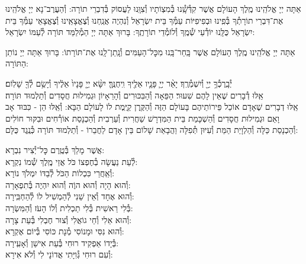 \documentclass[twoside, openany, parskip=half, 11pt]{book}
\begin{document}
אַתָּה יְיָ אֱלֹהֵֽינוּ מֶֽלֶךְ הָעוֹלָם אֲשֶׁר קִדְּ֯שָֽׁ֯נוּ בְּ֯מִצְוֹתָיו וְ֯צִוָּֽנוּ לַעֲסוֹק בְּ֯דִבְרֵי תוֹרָה: וְ֯הַעֲרֶב־נָא יְיָ אֱלֹהֵֽינוּ אֶת־דִּבְרֵי תוֹרָתְ֯ךָ בְּ֯פִֽינוּ וּבְפִיפִיּוֹת עַמְּ֯ךָ בֵּית יִשְׂרָאֵל וְ֯נִהְיֶה אֲנַֽחְנוּ וְ֯צֶאֱצָאֵֽינוּ וְ֯צֶאֱצָאֵי עַמְּ֯ךָ בֵּית יִשְׂרָאֵל כֻּלָּֽנוּ יוֹדְ֯עֵי שְׁ֯מֶֽךָ וְ֯לוֹמְ֯דֵי תוֹרָתֶֽךָ: בָּרוּךְ אַתָּה יְיָ הַמְ֯לַמֵּד תּוֹרָה לְ֯עַמּוֹ יִשְׂרָאֵל:

אַתָּה יְיָ אֱלֹהֵֽינוּ מֶֽלֶךְ הָעוֹלָם אֲשֶׁר בָּֽחַר־בָּֽנוּ מִכׇּל־הָעַמִּים וְ֯נָֽתַן־לָֽנוּ אֶת־תּוֹרָתוֹ: בָּרוּךְ אַתָּה יְיָ נוֹתֵן הַתּוֹרָה:



יְ֯בָֽרֶכְ֯ךָ֥ יְיָ֖ וְ֯יִשְׁמְ֯רֶֽךָ׃ יָאֵ֨ר יְיָ֧ פָּנָ֛יו אֵלֶ֖יךָ וִֽיחֻנֶּֽךָּ׃ יִשָּׂ֨א יְיָ֤ פָּנָיו֙ אֵלֶ֔יךָ וְ֯יָשֵׂ֥ם לְ֯ךָ֖ שָׁלֽוֹם׃\\
אֵֽלּוּ דְ֯בָרִים שֶׁאֵין לָהֶם שִׁעוּר׃ הַפֵּאָה וְ֯הַבִּכּוּרִים וְ֯הָרֵאָיוֹן וּגְמִילוּת חֲסָדִים וְ֯תַלְמוּד תּוֹרָה׃\\
אֵֽלּוּ דְבָרִים שֶׁאָדָם אוֹכֵל פֵּירוֹתֵיהֶם בָּעוֹלָם הַזֶּה וְ֯הַקֶּֽרֶן קַיֶּֽמֶת לוֹ לָעוֹלָם הַבָּא: וְ֯אֵֽלּוּ הֵן - כִּבּוּד אָב וָאֵם וּגְמִילוּת חֲסָדִים וְ֯הַשְׁכָּמַת בֵּית הַמִּדְרָשׁ שַׁחֲרִית וְ֯עַרְבִית וְ֯הַכְנָסַת אוֹרְ֯חִים וּבִקּוּר חוֹלִים וְ֯הַכְנָסַת כַּלָּה וְ֯הַלְוָיַת הַמֵּת וְ֯עִיּוּן תְּ֯פִלָּה וַהֲבָאַת שָׁלוֹם בֵּין אָדָם לַחֲבֵרוֹ - וְ֯תַלְמוּד תּוֹרָה כְּ֯נֶֽגֶד כֻּלָּם:




\newcommand{\adonolam}{

\firstword{אֲדוֹן עוֹלָם}
אֲשֶׁר מָלַךְ \hfill בְּ֯טֶֽרֶם כׇּל־יְ֯צִיר נִבְרָא: \\
לְ֯עֵת נַעֲשָׂה בְ֯חֶפְצוֹ כֹּל \hfill אֲזַי מֶֽלֶךְ שְׁ֯מוֹ נִקְרָא:\\
וְ֯אַֽחֲרֵי כִּכְלוֹת הַכֹּל \hfill לְ֯בַדּוֹ יִמְלֹךְ נוֹרָא: \\
וְ֯הוּא הָיָה וְ֯הוּא הוֶֹה \hfill וְ֯הוּא יִהְיֶה בְּ֯תִפְאָרָה: \\
וְ֯הוּא אֶחָד וְ֯אֵין שֵׁנִי \hfill לְ֯הַמְשִׁיל לוֹ לְ֯הַחְבִּֽירָה: \\
בְּ֯לִי רֵאשִׁית בְּ֯לִי תַכְלִית \hfill וְ֯לוֹ הָעֹז וְ֯הַמִּשְׂרָה: \\
וְ֯הוּא אֵלִי וְ֯חַי גוֹאֲלִי \hfill וְ֯צוּר חֶבְלִי בְּ֯עֵת צָרָה: \\
וְ֯הוּא נִסִּי וּמָנוֹסִי \hfill מְ֯נָת כּוֹסִי בְּ֯יוֹם אֶקְרָא: \\
בְּ֯יָדוֹ אַפְקִיד רוּחִי \hfill בְּ֯עֵת אִישַׁן וְ֯אָעִֽירָה: \\
וְ֯עִם רוּחִי גְּ֯וִיָּתִי \hfill אֲדוֹנָי לִי וְ֯לֹא אִירָא:
}
\adonolam
\end{document}

